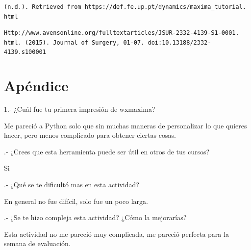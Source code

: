 \documentclass{article}
\begin{document}
\begin{verbatim}
(n.d.). Retrieved from https://def.fe.up.pt/dynamics/maxima_tutorial.
html 
\end{verbatim}

\begin{verbatim}
Http://www.avensonline.org/fulltextarticles/JSUR-2332-4139-S1-0001.
html. (2015). Journal of Surgery, 01-07. doi:10.13188/2332-4139.s100001 
\end{verbatim}



\section{Apéndice}


    1.- ¿Cuál fue tu primera impresión de wxmaxima?
    
    \vspace{0.3cm}
		Me pareció a Python solo que sin muchas maneras de personalizar lo que quieres hacer, pero menos complicado para obtener ciertas cosas.
    \vspace{0.3cm}
    
.- ¿Crees que esta herramienta puede ser útil en otros de tus cursos?
    
    \vspace{0.3cm}
 		Si
    \vspace{0.3cm}
    
.- ¿Qué se te dificultó mas en esta actividad?
    
    \vspace{0.3cm}
		En general no fue difícil, solo fue un poco larga.
    \vspace{0.3cm}
    
.- ¿Se te hizo compleja esta actividad? ¿Cómo la mejorarías? 
    
    \vspace{0.3cm}
		Esta actividad no me pareció muy complicada, me pareció perfecta para la semana de evaluación. 
    \vspace{0.3cm}
\end{document}
